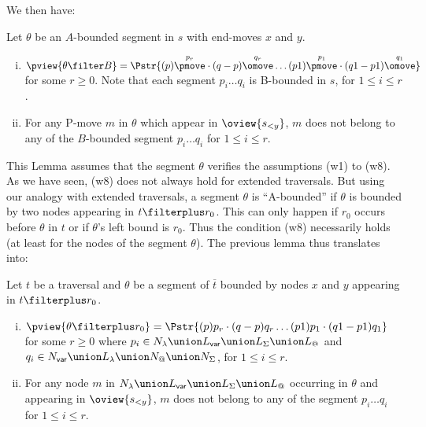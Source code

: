 We then have:
\begin{lemma}
Let $\theta$ be an $A$-bounded segment in $s$ with end-moves $x$ and
$y$.

\begin{enumerate}[(i)]
  \item $ \pview{\theta \filter B} = \Pstr{ (p){\stackrel{p_r}\pmove} \cdot (q-p){\stackrel{q_r}\omove} \ldots
                                     (p1){\stackrel{p_1}\pmove}
\cdot (q1-p1){\stackrel{q_1}\omove} }$ for some $r\geq 0$. Note
that each segment $p_i \ldots q_i$ is B-bounded in $s$, for
$1\leq i \leq r$.
  \item For any P-move $m$ in $\theta$ which appear in
$\oview{s_{<y}}$, $m$ does not belong to any of the $B$-bounded
segment $p_i \ldots q_i$ for $1\leq i \leq r$.
\end{enumerate}
\end{lemma}
This Lemma assumes that the segment $\theta$ verifies the
assumptions (w1) to (w8). As we have seen, (w8) does not always hold for extended traversals. But using our analogy with extended traversals, a  segment $\theta$ is ``A-bounded'' if $\theta$ is bounded by two nodes appearing in $t\filterplus r_0$. This can only happen if $r_0$ occurs before $\theta$ in $t$ or if $\theta$'s left bound is $r_0$.  Thus the condition (w8) necessarily holds (at least for the nodes of the segment $\theta$).
The previous lemma thus translates into:
\begin{lemma}
\label{lem:pview_bounded_segment} Let $t$ be a traversal and
$\theta$ be a segment of $\overline{t}$ bounded by nodes $x$ and $y$ appearing in $t\filterplus r_0$.
\begin{enumerate}[(i)]
  \item $ \pview{\theta \filterplus r_0} = \Pstr{ (p){p_r} \cdot (q-p){q_r} \ldots
(p1){p_1} \cdot (q1-p1){q_1} }$ for some $r\geq 0$ where
$p_i \in N_\lambda \union L_{\sf var} \union L_\Sigma \union
L_@$ and $q_i \in N_{\sf var} \union L_\lambda \union N_@
\union N_\Sigma$, for $1\leq i \leq r$.
  \item For any node $m$ in $N_\lambda \union L_{\sf var} \union L_\Sigma \union L_@$ occurring in $\theta$ and appearing in
$\oview{s_{<y}}$, $m$ does not belong to any of the
segment $p_i \ldots q_i$ for $1\leq i \leq r$.
\end{enumerate}
\end{lemma}
\smallskip

